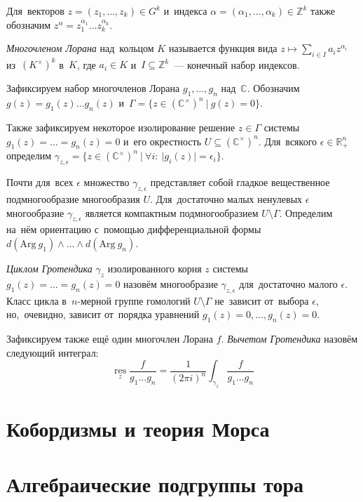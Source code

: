 \documentclass{article}
\begin{document}
Для~векторов $z = (z_1, \ldots, z_k) \in G^k$ и~индекса $\alpha = (\alpha_1, \ldots, \alpha_k) \in \mathbb{Z}^k$
также обозначим $z^\alpha = z_1^{\alpha_1} \ldots z_k^{\alpha_k}$.

\textit{Многочленом Лорана} над~кольцом $K$ называется функция вида $z \mapsto \sum_{i \in I} a_i z^{\alpha_i}$ из~$(K^\times)^k$ в~$K$,
где $a_i \in K$ и~$I \subseteq \mathbb{Z}^k$~— конечный набор индексов.

Зафиксируем набор многочленов Лорана $g_1, \ldots, g_n$ над~$\mathbb{C}$.
Обозначим $g(z) = g_1(z) \ldots g_n(z)$ и~$\Gamma = \{ z \in (\mathbb{C}^\times)^n \ | \ g(z) = 0 \}$.

Также зафиксируем некоторое изолирование решение $z \in \Gamma$ системы $g_1(z) = \ldots = g_n(z) = 0$ и~его окрестность $U \subseteq (\mathbb{C}^\times)^n$.
Для~всякого $\epsilon \in \mathbb{R}_{+}^n$ определим $\gamma_{z, \epsilon} = \{ z \in (\mathbb{C}^\times)^n\ | \ \forall i{:}\ |g_i(z)| = \epsilon_i \}$.

Почти для~всех $\epsilon$ множество $\gamma_{z, \epsilon}$ представляет собой гладкое вещественное подмногообразие многообразия $U$.
Для~достаточно малых ненулевых $\epsilon$ многообразие $\gamma_{z, \epsilon}$ является компактным подмногообразием $U \setminus \Gamma$.
Определим на~нём ориентацию с~помощью дифференциальной формы $d(\mathrm{Arg}\ g_1) \wedge \ldots \wedge d(\mathrm{Arg}\ g_n)$.

\textit{Циклом Гротендика} $\gamma_z$ \cite{GelKho02} изолированного корня $z$ системы $g_1(z) = \ldots = g_n(z) = 0$ назовём многообразие $\gamma_{z, \epsilon}$ для~достаточно малого $\epsilon$.
Класс цикла в~$n$-мерной группе гомологий $U \setminus \Gamma$ не~зависит от~выбора $\epsilon$, но,~очевидно, зависит от~порядка уравнений $g_1(z) = 0, \ldots, g_n(z) = 0$.

Зафиксируем также ещё один многочлен Лорана $f$. \textit{Вычетом Гротендика} назовём следующий интеграл:
$$
  \operatorname*{res}\limits_{z} \frac{f}{g_1 \ldots g_n} = \frac{1}{(2 \pi i)^n} \int_{\gamma_z} \frac{f}{g_1 \ldots g_n}
$$

\section{Кобордизмы и теория Морса}

\section{Алгебраические подгруппы тора}
\end{document}
